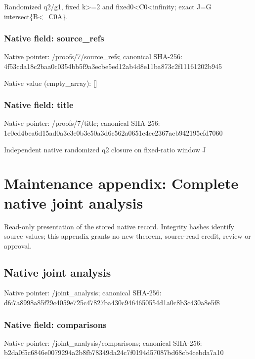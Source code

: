 \documentclass[10pt,a4paper]{article}
\begin{document}
\begingroup\raggedright\sloppy Randomized q2/\allowbreak{}g1,\allowbreak{} fixed k>=\allowbreak{}2 and fixed0<C0<infinity;\allowbreak{} exact J=\allowbreak{}G intersect\{B<=\allowbreak{}C0A\}.\par\endgroup

\subsubsection{Native field: source\_\allowbreak{}refs}
Native pointer: /proofs/7/source\_\allowbreak{}refs; canonical SHA-256: 4f53cda18c2baa0c0354bb5f9a3ecbe5ed12ab4d8e11ba873c2f11161202b945

Native value (empty\_\allowbreak{}array): []

\subsubsection{Native field: title}
Native pointer: /proofs/7/title; canonical SHA-256: 1e0cd4bea6d15ad0a3c3e0b3e50a3d6c562a0651e4ec2367acb942195cfd7060

\begingroup\raggedright\sloppy Independent native randomized q2 closure on fixed-ratio window J\par\endgroup

\section{Maintenance appendix: Complete native joint analysis}
Read-only presentation of the stored native record. Integrity hashes identify source values; this appendix grants no new theorem, source-read credit, review or approval.

\subsection{Native joint analysis}
Native pointer: /joint\_\allowbreak{}analysis; canonical SHA-256: dfc7a8998a85f29c4059e725c47827ba430c9464650554d1a0c8b3c430a8e5f8

\subsubsection{Native field: comparisons}
Native pointer: /joint\_\allowbreak{}analysis/comparisons; canonical SHA-256: b2da0f5c6846e0079294a2b8fb78349da24c7f0194d57087bd68cb4cebda7a10
\end{document}
